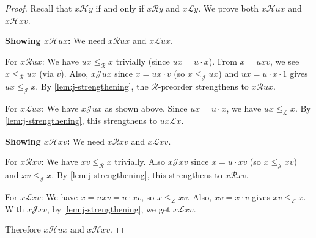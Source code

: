 \begin{proof}
\leanok
Recall that $x \mathcal{H} y$ if and only if $x \mathcal{R} y$ and $x \mathcal{L} y$. We prove both $x \mathcal{H} ux$ and $x \mathcal{H} xv$.

\textbf{Showing $x \mathcal{H} ux$:} We need $x \mathcal{R} ux$ and $x \mathcal{L} ux$.

For $x \mathcal{R} ux$: We have $ux \leq_{\mathcal{R}} x$ trivially (since $ux = u \cdot x$). From $x = uxv$, we see $x \leq_{\mathcal{R}} ux$ (via $v$). Also, $x \mathcal{J} ux$ since $x = ux \cdot v$ (so $x \leq_{\mathcal{J}} ux$) and $ux = u \cdot x \cdot 1$ gives $ux \leq_{\mathcal{J}} x$. By \ref{lem:j-strengthening}, the $\mathcal{R}$-preorder strengthens to $x \mathcal{R} ux$.

For $x \mathcal{L} ux$: We have $x \mathcal{J} ux$ as shown above. Since $ux = u \cdot x$, we have $ux \leq_{\mathcal{L}} x$. By \ref{lem:j-strengthening}, this strengthens to $ux \mathcal{L} x$.

\textbf{Showing $x \mathcal{H} xv$:} We need $x \mathcal{R} xv$ and $x \mathcal{L} xv$.

For $x \mathcal{R} xv$: We have $xv \leq_{\mathcal{R}} x$ trivially. Also $x \mathcal{J} xv$ since $x = u \cdot xv$ (so $x \leq_{\mathcal{J}} xv$) and $xv \leq_{\mathcal{J}} x$. By \ref{lem:j-strengthening}, this strengthens to $x \mathcal{R} xv$.

For $x \mathcal{L} xv$: We have $x = uxv = u \cdot xv$, so $x \leq_{\mathcal{L}} xv$. Also, $xv = x \cdot v$ gives $xv \leq_{\mathcal{L}} x$. With $x \mathcal{J} xv$, by \ref{lem:j-strengthening}, we get $x \mathcal{L} xv$.

Therefore $x \mathcal{H} ux$ and $x \mathcal{H} xv$.
\end{proof}

